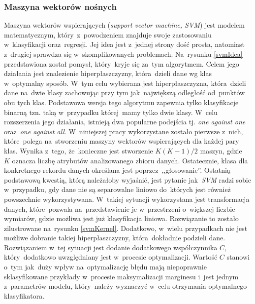 \subsubsection{Maszyna wektorów nośnych}
Maszyna wektorów wspierających (\textit{support vector machine, SVM}) jest modelem matematycznym, który~z~powodzeniem znajduje swoje zastosowaniu w~klasyfikacji oraz~regresji. Jej idea jest z~jednej strony dość prosta, natomiast z~drugiej sprawdza się w~skomplikowanych problemach\cite{svm1}. Na~rysunku \ref{svmIdea} przedstawiona został pomysł, który~kryje się za~tym algorytmem. Celem jego działania jest znalezienie hiperpłaszczyzny, która~dzieli dane wg klas w~optymalny sposób. W~tym celu wybierana jest hiperpłaszczyzna, która~dzieli dane na~dwie klasy zachowując przy tym jak~największą odległość od~punktów obu tych klas\cite{svm2}. Podstawowa wersja tego algorytmu zapewnia tylko klasyfikacje binarną tzn. taką w~przypadku której~mamy tylko dwie klasy. W~celu rozszerzenia jego działania, istnieją dwa popularne podejścia  tj. \textit{one against one} oraz~\textit{one against all}\cite{svm3}. W~niniejszej pracy wykorzystane zostało pierwsze z~nich, które~polega na~stworzeniu maszyny wektorów wspierających dla każdej pary klas. Wynika z~tego, że~konieczne jest stworzenie $K(K-1)/2$ maszyn, gdzie ~$K$ oznacza liczbę atrybutów analizowanego zbioru danych. Ostatecznie, klasa dla konkretnego rekordu danych określana jest poprzez~,,głosowanie''. Ostatnią podstawową kwestią, którą należałoby wyjaśnić, jest pytanie jak~\textit{SVM} radzi sobie w~przypadku, gdy dane nie są separowalne liniowo do~których jest również powszechnie wykorzystywana. W~takiej sytuacji wykorzystana jest transformacja danych, które~pozwala na~przedstawienie je w~przestrzeni o~większej liczbie wymiarów, gdzie możliwa jest już klasyfikacja liniowa. Rozwiązanie to zostało zilustrowane na~rysunku \ref{svmKernel}. Dodatkowo, w~wielu przypadkach nie jest możliwe dobranie takiej hiperpłaszczyzny, która~dokładnie podzieli dane. Rozwiązaniem w~tej sytuacji jest dodanie dodatkowego współczynnika $C$, który~dodatkowo uwzględniany jest w~procesie optymalizacji. Wartość $C$ stanowi o~tym jak~duży wpływ na~optymalizację błędu mają niepoprawnie sklasyfikowane przykłady w~procesie maksymalizacji marginesu i~jest jednym z~parametrów modelu, który~należy wyznaczyć w~celu otrzymania optymalnego klasyfikatora. 

